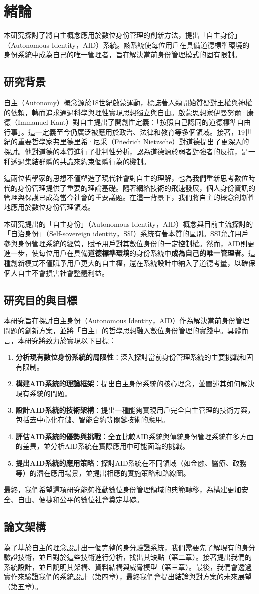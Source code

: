 
\chapter{緒論}
本研究探討了將自主概念應用於數位身份管理的創新方法，提出「自主身份」（Autonomous Identity，AID）系統。該系統使每位用戶在具備道德標準環境的身份系統中成為自己的唯一管理者，旨在解決當前身份管理模式的固有限制。
\section{研究背景}
自主（Autonomy）概念源於18世紀啟蒙運動，標誌著人類開始質疑對王權與神權的依賴，轉而追求通過科學與理性實現思想獨立與自由。啟蒙思想家伊曼努爾·康德（Immanuel Kant）對自主提出了開創性定義：「按照自己認同的道德標準自由行事」。這一定義至今仍廣泛被應用於政治、法律和教育等多個領域。接著，19世紀的重要哲學家弗里德里希·尼采（Friedrich Nietzsche）對道德提出了更深入的探討。他對道德的本質進行了批判性分析，認為道德源於弱者對強者的反抗，是一種透過集結群體的共識來約束個體行為的機制。

這兩位哲學家的思想不僅塑造了現代社會對自主的理解，也為我們重新思考數位時代的身份管理提供了重要的理論基礎。隨著網絡技術的飛速發展，個人身份資訊的管理與保護已成為當今社會的重要議題。在這一背景下，我們將自主的概念創新性地應用於數位身份管理領域。

本研究提出的「自主身份」（Autonomous Identity，AID）概念與目前主流探討的「自治身份」（Self-sovereign identity，SSI）系統有著本質的區別。SSI允許用戶參與身份管理系統的經營，賦予用戶對其數位身份的一定控制權。然而，AID則更進一步，使每位用戶在具備\textbf{道德標準環境}的身份系統中\textbf{成為自己的唯一管理者}。這種創新模式不僅賦予用戶更大的自主權，還在系統設計中納入了道德考量，以確保個人自主不會損害社會整體利益。
\section{研究目的與目標}
本研究旨在探討自主身份（Autonomous Identity，AID）作為解決當前身份管理問題的創新方案，並將「自主」的哲學思想融入數位身份管理的實踐中。具體而言，本研究將致力於實現以下目標：
\begin{enumerate}
  \item \textbf{分析現有數位身份系統的局限性}：深入探討當前身份管理系統的主要挑戰和固有限制。
  \item \textbf{構建AID系統的理論框架}：提出自主身份系統的核心理念，並闡述其如何解決現有系統的問題。
  \item \textbf{設計AID系統的技術架構}：提出一種能夠實現用戶完全自主管理的技術方案，包括去中心化存儲、智能合約等關鍵技術的應用。
  \item \textbf{評估AID系統的優勢與挑戰}：全面比較AID系統與傳統身份管理系統在多方面的差異，並分析AID系統在實際應用中可能面臨的挑戰。
  \item \textbf{提出AID系統的應用策略}：探討AID系統在不同領域（如金融、醫療、政務等）的潛在應用場景，並提出相應的實施策略和路線圖。
\end{enumerate}
最終，我們希望這項研究能夠推動數位身份管理領域的典範轉移，為構建更加安全、自由、便捷和公平的數位社會奠定基礎。
\section{論文架構}
為了基於自主的理念設計出一個完整的身分驗證系統，我們需要先了解現有的身分驗證技術，並且對於這些技術進行分析，找出其缺點（第二章）。接著提出我們的系統設計，並且說明其架構、資料結構與威脅模型（第三章）。最後，我們會透過實作來驗證我們的系統設計（第四章），最終我們會提出結論與對方案的未來展望（第五章）。